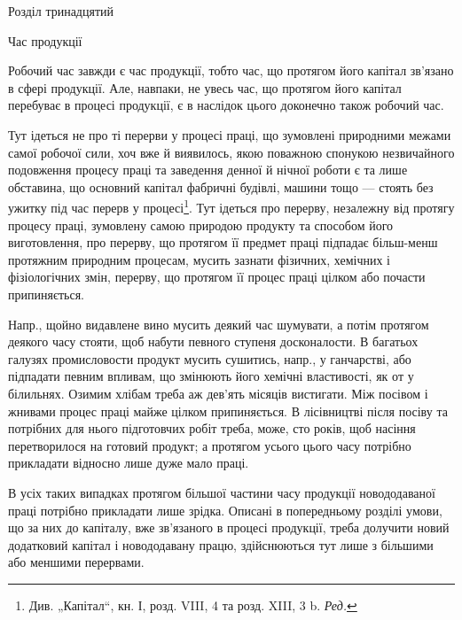 Розділ тринадцятий

Час продукції

Робочий час завжди є час продукції, тобто час, що протягом його
капітал зв’язано в сфері продукції. Але, навпаки, не увесь час, що протягом
його капітал перебуває в процесі продукції, є в наслідок цього
доконечно також робочий час.

Тут ідеться не про ті перерви у процесі праці, що зумовлені природними
межами самої робочої сили, хоч вже й виявилось, якою поважною
спонукою незвичайного подовження процесу праці та заведення
денної й нічної роботи є та лише обставина, що основний капітал
фабричні будівлі, машини тощо — стоять без ужитку під час перерв у процесі\footnote*{
Див. „Капітал“, кн. І, розд. VIII, 4 та розд. XIII, 3 b. \emph{Ред.}
}.
Тут ідеться про перерву, незалежну від протягу процесу праці,
зумовлену самою природою продукту та способом його виготовлення,
про перерву, що протягом її предмет праці підпадає більш-менш протяжним
природним процесам, мусить зазнати фізичних, хемічних і фізіологічних
змін, перерву, що протягом її процес праці цілком або почасти
припиняється.

Напр., щойно видавлене вино мусить деякий час шумувати, а потім
протягом деякого часу стояти, щоб набути певного ступеня досконалости.
В багатьох галузях промисловости продукт мусить сушитись, напр., у
ганчарстві, або підпадати певним впливам, що змінюють його хемічні
властивості, як от у білильнях. Озимим хлібам треба аж дев’ять місяців
вистигати. Між посівом і жнивами процес праці майже цілком припиняється.
В лісівництві після посіву та потрібних для нього підготовчих
робіт треба, може, сто років, щоб насіння перетворилося на готовий продукт;
а протягом усього цього часу потрібно прикладати відносно лише
дуже мало праці.

В усіх таких випадках протягом більшої частини часу продукції новододаваної
праці потрібно прикладати лише зрідка. Описані в попередньому
розділі умови, що за них до капіталу, вже зв’язаного в процесі
продукції, треба долучити новий додатковий капітал і новододавану працю,
здійснюються тут лише з більшими або меншими перервами.

